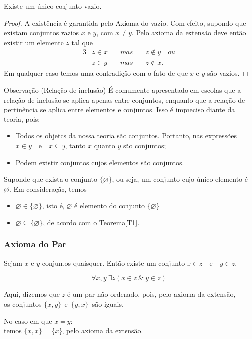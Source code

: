 \begin{theorem}\label{T2}
    Existe um único conjunto vazio.    
\end{theorem}
\begin{proof}
A existência é garantida pelo Axioma do vazio. Com efeito, supondo que existam conjuntos vazios $x$ e $y$, com $x \neq y$. Pelo axioma da extensão deve então existir um elemento $z$ tal que
\begin{alignat*}{3}
    & z \in x  \quad & mas \quad & z \notin y\quad ou\\
    & z \in y  \quad & mas \quad & z \notin x.
\end{alignat*}
Em qualquer caso temos uma contradição com o fato de que $x$ e $y$ são vazios.
\end{proof}

\begin{mymdframed}{Observação (Relação de inclusão)}
    É comumente apresentado em escolas que a relação de inclusão se aplica apenas entre conjuntos, enquanto que a relação de pertinência se aplica entre elementos e conjuntos. Isso é impreciso diante da teoria, pois:
    \begin{itemize}
        \item Todos os objetos da nossa teoria são conjuntos. Portanto, nas expressões $x \in y$\ \ e\ \ $x \subseteq y$, tanto $x$ quanto $y$ são conjuntos;
        \item Podem existir conjuntos cujos elementos são conjuntos.
    \end{itemize}
    Suponde que exista o conjunto $\{\varnothing\}$, ou seja, um conjunto cujo único elemento é $\varnothing$. Em consideração, temos
    \begin{itemize}
        \item $\varnothing \in \{\varnothing\}$, isto é, $\varnothing$ é elemento do conjunto $\{\varnothing\}$
        \item $\varnothing \subseteq \{\varnothing\}$, de acordo com o Teorema\ref{T1}.
    \end{itemize}
\end{mymdframed}
\subsubsection{Axioma do Par}
\begin{stat}
    Sejam $x$ e $y$ conjuntos quaisquer. Então existe um conjunto $x \in z$\ \ e\ \ $y \in z$.
\end{stat}
    $$\forall x, y\ \exists z (x \in z\ \&\ y \in z)$$
\begin{center}
Aqui, dizemos que $z$ é um par não ordenado, pois, pelo axioma da extensão, \\
os conjuntos $\{x, y\}$\ e\ $\{y, x\}$\ são iguais.
\end{center}
\begin{exmp}
    No caso em que $x=y$: \\
    temos $\{x, x\} = \{x\}$, pelo axioma da extensão.
\end{exmp}

